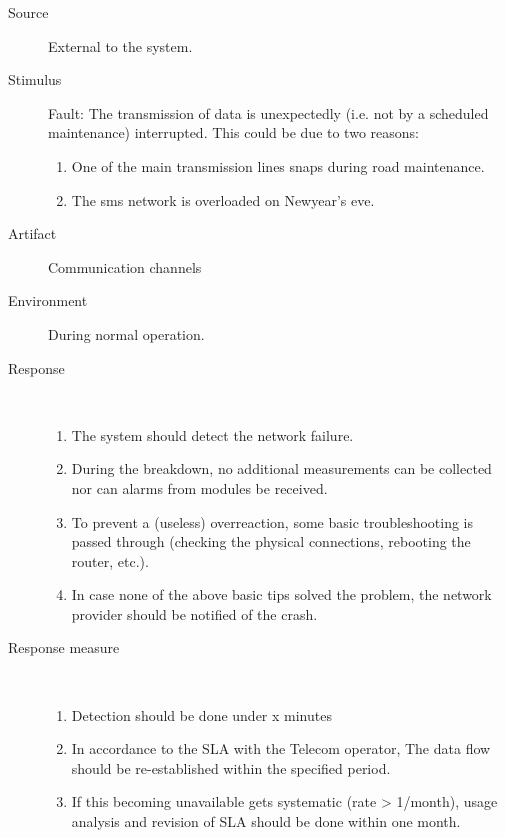 \begin{description}
	\item[Source] External to the system.
	\item[Stimulus] Fault: The transmission of data is unexpectedly
	(i.e. not by a scheduled maintenance) interrupted.
	This could be due to two reasons:
	\begin{enumerate}
	  \item One of the main transmission lines snaps during road maintenance.
	  \item The sms network is overloaded on Newyear's eve.
	\end{enumerate}
	\item[Artifact] Communication channels
	\item[Environment] During normal operation.
	\item[Response] \
	\begin{enumerate}
	  \item The system should detect the network failure.
	  \item During the breakdown, no additional measurements can be collected nor
	  can alarms from modules be received. 
	  \item To prevent a (useless) overreaction, some basic troubleshooting is
	  passed through (checking the physical connections, rebooting the router,
	  etc.).
	  \item In case none of the above basic tips solved the problem, the network
	  provider should be notified of the crash.
	\end{enumerate}
	\item[Response measure] \
	\begin{enumerate}
	  \item Detection should be done under x minutes %
	  \item In accordance to the SLA with the Telecom operator, The data flow
	  should be re-established within the specified period.
	  \item If this becoming unavailable gets systematic (rate > 1/month), usage
analysis and revision of SLA should be done within one month. %
	\end{enumerate}
\end{description}